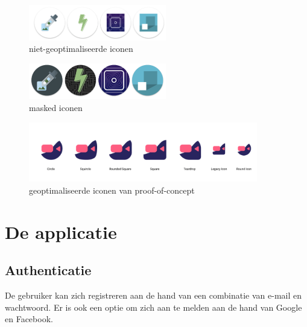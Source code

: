 		\begin{figure}[H]
			\centering
			\includegraphics[width=60mm]{./img/traditionalIcons}{}
			\caption{niet-geoptimaliseerde iconen}
		\end{figure}
		\begin{figure}[H]
			\centering
			\includegraphics[width=60mm]{./img/maskedicons}{}
			\caption{masked iconen}
		\end{figure}
		\begin{figure}[H]
			\centering
			\includegraphics[width=100mm]{./img/iconPWA.png}{}
			\caption{geoptimaliseerde iconen van proof-of-concept}
		\end{figure}

\newpage
\section{De applicatie}
	\subsection{Authenticatie}
		De gebruiker kan zich registreren aan de hand van een combinatie van e-mail en wachtwoord. Er is ook een optie om zich aan te melden aan de hand van Google en Facebook.
		
